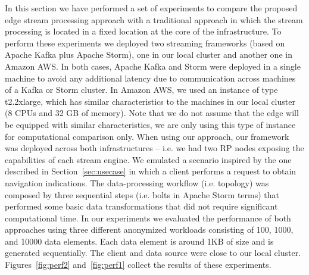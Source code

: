 In this section we have performed a set of experiments to compare the proposed edge stream processing approach with a traditional approach in which the stream processing is located in a fixed location at the core of the infrastructure. To perform these experiments we deployed two streaming frameworks (based on Apache Kafka plus Apache Storm), one in our local cluster and another one in Amazon AWS. In both cases, Apache Kafka and Storm were deployed in a single machine to avoid any additional latency due to communication across machines of a Kafka or Storm cluster. In Amazon AWS, we used an instance of type  t2.2xlarge, which has similar characteristics to the machines in our local cluster (8 CPUs and 32 GB of memory). Note that we do not assume that the edge will be equipped with similar characteristics, we are only using this type of instance for computational comparison only. When using our approach, our framework was deployed across both infrastructures -- i.e. we had two RP nodes exposing the capabilities of each stream engine. We emulated a scenario inspired by the one described in Section~\ref{sec:usecase} in which a client performs a request to obtain navigation indications. The data-processing workflow (i.e. topology) was composed by three sequential steps (i.e. bolts in Apache Storm terms) that performed some basic data transformations that did not require significant computational time. In our experiments we evaluated the performance of both approaches using three different anonymized workloads consisting of 100, 1000, and 10000 data elements. Each data element is around 1KB of size and is generated sequentially. The client and data source were close to our local cluster. Figures~\ref{fig:perf2} and~\ref{fig:perf1} collect the results of these experiments.

